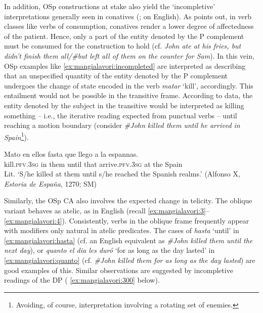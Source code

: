 \documentclass[output=paper,colorlinks,citecolor=brown,
]{langscibook}
\begin{document}
In addition, OSp constructions at stake also yield the ‘incompletive’ interpretations generally seen in conatives (\citealt{Krifka1999}; \citealt{Beavers2006} on English). As \citet{Beavers2006, Beavers2011, Beavers2013} points out, in verb classes like verbs of consumption, conatives render a lower degree of affectedness of the patient. Hence, only a part of the entity denoted by the P complement must be consumed for the construction to hold (cf. \textit{John ate at his fries, but didn’t finish them all/\#but left all of them on the counter for Sam}). In this vein, OSp examples like  \ref{ex:mangialavori:incompleted} are interpreted as describing that an unspecified quantity of the entity denoted by the P complement undergoes the change of state encoded in the verb \textit{matar} ‘kill’, accordingly. This entailment would not be possible in the transitive frame. According to data, the entity denoted by the subject in the transitive would be interpreted as killing something -- i.e., the iterative reading expected from punctual verbs -- until reaching a motion boundary (consider \textit{\#John killed them until he arrived in Spain}\footnote{Avoiding, of course, interpretation involving a rotating set of enemies.}).

\ea\label{ex:mangialavori:incompleted}
    \gll Mato en ellos fasta que llego a la espannas.\\
kill.\textsc{pfv}.\textsc{3sg} in them until that arrive.\textsc{pfv}.\textsc{3sg} at the Spain\\
    \glt Lit. `S/he killed at them until s/he reached the Spanish realms.' (Alfonso X, \textit{Estoria de España}, 1270; SM)
\z

Similarly, the OSp CA also involves the expected change in telicity. The oblique variant behaves as atelic, as in English (recall  \ref{ex:mangialavori:3}--\ref{ex:mangialavori:4}). Consistently, verbs in the oblique frame frequently appear with modifiers only natural in atelic predicates. The cases of \textit{hasta} ‘until’ in  \ref{ex:mangialavori:hasta} (cf. an English equivalent as \textit{\#John killed them until the next day}), or \textit{quanto el dia les duró} ‘for as long as the day lasted’ in  \ref{ex:mangialavori:quanto} (cf. \textit{\#John killed them for as long as the day lasted}) are good examples of this. Similar observations are suggested by incompletive readings of the DP ( \ref{ex:mangialavori:300} below). 
\end{document}
